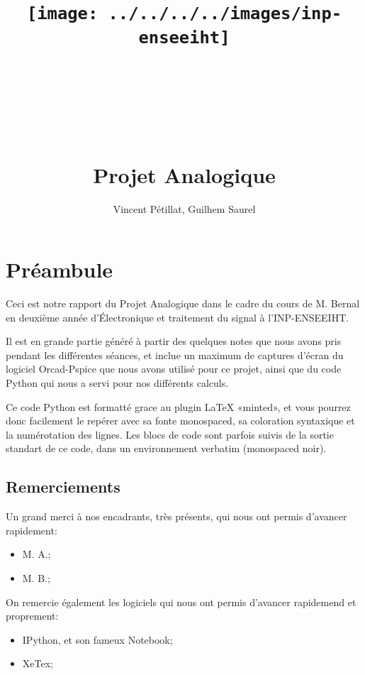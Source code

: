 \documentclass{article}
\title{\texttt{[image: ../../../../images/inp-enseeiht]} \\ ~ \\ ~ \\ ~ \\ ~ \\ Projet Analogique}
\author{Vincent Pétillat, Guilhem Saurel}
\date{\oldstylenums{\today}}
\begin{document}
\begin{titlepage}
    \setcounter{page}{0}
    \maketitle
    \thispagestyle{empty}
\end{titlepage}

\tableofcontents

\section*{Préambule}

Ceci est notre rapport du Projet Analogique dans le cadre du cours de M. Bernal
en deuxième année d’Électronique et traitement du signal à l’INP-ENSEEIHT.

Il est en grande partie généré à partir des quelques notes que nous avons pris
pendant les différentes séances, et inclue un maximum de captures d’écran du logiciel
Orcad-Pspice que nous avons utilisé pour ce projet, ainsi que du code Python
qui nous a servi pour nos différents calculs.

Ce code Python est formatté grace au plugin LaTeX «minted», et vous pourrez donc
facilement le repérer avec sa fonte monospaced, sa coloration syntaxique et
la numérotation des lignes. Les blocs de code sont parfois suivis de la sortie
standart de ce code, dans un environnement verbatim (monospaced noir).

\subsection*{Remerciements}
Un grand merci à nos encadrants, très présents, qui nous ont permis d’avancer rapidement:
\begin{itemize}
    \item M. A.;
    \item M. B.;
\end{itemize}

On remercie également les logiciels qui nous ont permis d’avancer rapidemend et proprement:
\begin{itemize}
    \item IPython, et son fameux Notebook;
    \item XeTex;
\end{itemize}


\end{document}
